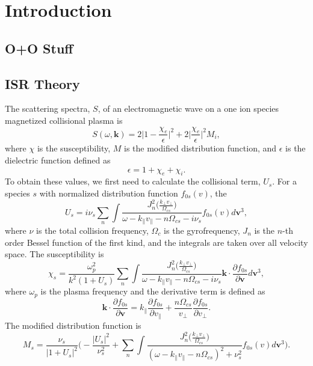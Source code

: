 \chapter{Introduction}

\section{O+O Stuff}

\section{ISR Theory}
\label{s:ISR-spectra}
The scattering spectra, $S$, of an electromagnetic wave on a one ion species magnetized collisional plasma is
\begin{equation}
	S(\omega,\mathbf{k}) = 2 \Big| 1 - \frac{\chi_e}{\epsilon}\Big|^2
	+ 2\Big|\frac{\chi_e}{\epsilon}\Big|^2 M_i,
	\label{eq:scatterin-spectra}
\end{equation}
where $\chi$ is the susceptibility, 
$M$ is the modified distribution function,
and $\epsilon$ is the dielectric function defined as
\begin{equation}
	\epsilon = 1 + \chi_e + \chi_i.
\end{equation}
To obtain these values, we first need to calculate the collisional term, $U_s$. %
For a species $s$ with normalized distribution function $f_{0s}(v)$, the 
\begin{equation}
	U_s = i \nu_s \sum_n \int 
	\frac{J_n^2\Big( \tfrac{k_\perp v_\perp}{\Omega_{cs}} \Big)}
	{\omega - k_\parallel v_\parallel - n\Omega_{cs} - i\nu_s}  
	f_{0s}(v)   d\mathbf{v}^3 ,
\end{equation}
where $\nu$ is the total collision frequency,
$\Omega_{c}$ is the gyrofrequency,
$J_n$ is the $n$-th order Bessel function of the first kind,
and the integrals are taken over all velocity space.
The susceptibility is
\begin{equation}
	\chi_s = \frac{\omega_p^2}{k^2(1+U_s)} \sum_n \int 
	\frac{J_n^2\Big( \tfrac{k_\perp v_\perp}{\Omega_{cs}} \Big)}
	{\omega - k_\parallel v_\parallel - n\Omega_{cs} - i\nu_s}  
	\mathbf{k} \cdot \frac{\partial f_{0s}}{\partial \mathbf{v}}   d\mathbf{v}^3 ,
\end{equation} 
where $\omega_p$ is the plasma frequency
and the derivative term is defined as
\begin{equation}
	\mathbf{k} \cdot \frac{\partial f_{0s}}{\partial \mathbf{v}} = 
	k_\parallel \frac{\partial f_{0s}}{\partial v_\parallel}
	+ \frac{n \Omega_{cs}}{v_\perp} \frac{\partial f_{0s}}{\partial v_\perp}.
\end{equation}
The modified distribution function is 
\begin{equation}
	M_s = \frac{\nu_s}{|1+U_s|^2}
	\Bigg( - \frac{|U_s|^2}{\nu_s^2} 
	+ \sum_n \int 
	\frac{J_n^2\Big( \tfrac{k_\perp v_\perp}{\Omega_{cs}} \Big)}
	{(\omega - k_\parallel v_\parallel - n\Omega_{cs})^2 + \nu_s^2}
	f_{0s}(v)   d\mathbf{v}^3 \Bigg).
\end{equation}

